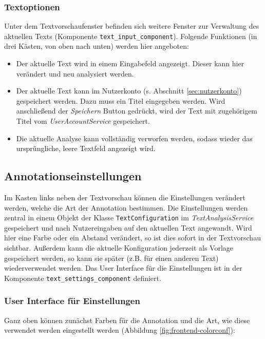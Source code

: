 \subsubsection{Textoptionen}

Unter dem Textvorschaufenster befinden sich weitere Fenster zur Verwaltung des aktuellen Texts (Komponente \texttt{text\_input\_component}). Folgende Funktionen (in drei Kästen, von oben nach unten) werden hier angeboten:
\begin{itemize}
	\item Der aktuelle Text wird in einem Eingabefeld angezeigt. Dieser kann hier verändert und neu analysiert werden.
	\item Der aktuelle Text kann im Nutzerkonto (s. Abschnitt \ref{sec:nutzerkonto}) gespeichert werden. Dazu muss ein Titel eingegeben werden. Wird anschließend der \textit{Speichern} Button gedrückt, wird der Text mit zugehörigem Titel vom \textit{UserAccountService} gespeichert.
	\item Die aktuelle Analyse kann vollständig verworfen werden, sodass wieder das ursprüngliche, leere Textfeld angezeigt wird.
\end{itemize}

\subsection{Annotationseinstellungen}

Im Kasten links neben der Textvorschau können die Einstellungen verändert werden, welche die Art der Annotation bestimmen. Die Einstellungen werden zentral in einem Objekt der Klasse \texttt{TextConfiguration} im \textit{TextAnalysisService} gespeichert und nach Nutzereingaben auf den aktuellen Text angewandt. Wird hier eine Farbe oder ein Abstand verändert, so ist dies sofort in der Textvorschau sichtbar. Außerdem kann die aktuelle Konfiguration jederzeit als Vorlage gespeichert werden, so kann sie später (z.B. für einen anderen Text) wiederverwendet werden. Das User Interface für die Einstellungen ist in der Komponente \texttt{text\_settings\_component} definiert.

\subsubsection{User Interface für Einstellungen}

Ganz oben können zunächst Farben für die Annotation und die Art, wie diese verwendet werden eingestellt werden (Abbildung \ref{fig:frontend-colorconf}):

